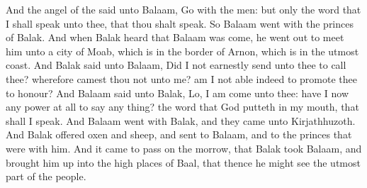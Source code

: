 \begin{biblechapter}
\verse And the angel of the \LORD said unto Balaam, Go with the men: but only the word that I shall speak unto thee, that thou shalt speak. So Balaam went with the princes of Balak.
\verse And when Balak heard that Balaam was come, he went out to meet him unto a city of Moab, which is in the border of Arnon, which is in the utmost coast.
\verse And Balak said unto Balaam, Did I not earnestly send unto thee to call thee? wherefore camest thou not unto me? am I not able indeed to promote thee to honour?
\verse And Balaam said unto Balak, Lo, I am come unto thee: have I now any power at all to say any thing? the word that God putteth in my mouth, that shall I speak.
\verse And Balaam went with Balak, and they came unto Kirjathhuzoth.
\verse And Balak offered oxen and sheep, and sent to Balaam, and to the princes that were with him.
\verse And it came to pass on the morrow, that Balak took Balaam, and brought him up into the high places of Baal, that thence he might see the utmost part of the people.
\end{biblechapter}

